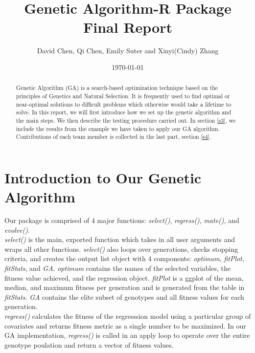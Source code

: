 \documentclass{article}
\begin{document}


\title{\LARGE Genetic Algorithm-R Package Final Report}
\author{David Chen, Qi Chen, Emily Suter and Xinyi(Cindy) Zhang}

\date{\today}

\maketitle

\begin{abstract}
Genetic Algorithm (GA) is a search-based optimization technique based on the principles of Genetics and Natural Selection. It is frequently used to find optimal or near-optimal solutions to difficult problems which otherwise would take a lifetime to solve. In this report, we will first introduce how we set up the genetic algorithm and the main steps. We then describe the testing procedure carried out. In section \ref{s3}, we include the results from the example we have taken to apply our GA algorithm. Contributions of each team member is collected in the last part, section \ref{s4}.
\end{abstract}

\newpage
\pagestyle{empty}

\section{Introduction to Our Genetic Algorithm}\label{s1}

Our package is comprised of 4 major functions: \textit{select()}, \textit{regress()}, \textit{mate()}, and \textit{evolve()}.\\

\textit{select()} is the main, exported function which takes in all user arguments and wraps all other functions. \textit{select()} also loops over generations, checks stopping criteria, and creates the output list object with 4 components: \textit{optimum}, \textit{fitPlot}, \textit{fitStats}, and \textit{GA}. \textit{optimum} contains the names of the selected variables, the fitness value achieved, and the regression object. \textit{fitPlot} is a ggplot of the mean, median, and maximum fitness per generation and is generated from the table in \textit{fitStats}. \textit{GA} contains the elite subset of genotypes and all fitness values for each generation.\\

\textit{regress()} calculates the fitness of the regresssion model using a particular group of covariates and returns fitness metric as a single number to be maximized. In our GA implementation, \textit{regress()} is called in an apply loop to operate over the entire genotype poulation and return a vector of fitness values.\\
\end{document}
